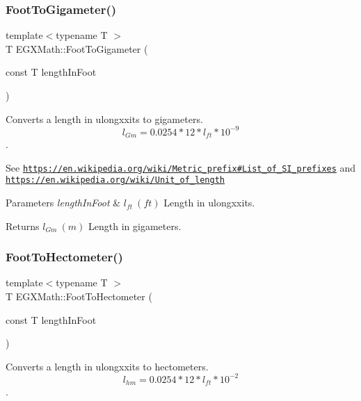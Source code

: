 \subsubsection{\texorpdfstring{Foot\+To\+Gigameter()}{FootToGigameter()}}
{\footnotesize\ttfamily template$<$typename T $>$ \\
T E\+G\+X\+Math\+::\+Foot\+To\+Gigameter (\begin{DoxyParamCaption}\item[{const T}]{length\+In\+Foot }\end{DoxyParamCaption})}



Converts a length in ulongxxits to gigameters. \[ l_{Gm}=0.0254 * 12 * l_{ft} * 10^{-9} \]. 

See \href{https://en.wikipedia.org/wiki/Metric_prefix#List_of_SI_prefixes}{\tt https\+://en.\+wikipedia.\+org/wiki/\+Metric\+\_\+prefix\#\+List\+\_\+of\+\_\+\+S\+I\+\_\+prefixes} and \href{https://en.wikipedia.org/wiki/Unit_of_length}{\tt https\+://en.\+wikipedia.\+org/wiki/\+Unit\+\_\+of\+\_\+length} 
\begin{DoxyParams}{Parameters}
{\em length\+In\+Foot} & $ l_{ft}\ (ft)$ Length in ulongxxits. \\
\hline
\end{DoxyParams}
\begin{DoxyReturn}{Returns}
$ l_{Gm}\ (m)$ Length in gigameters. 
\end{DoxyReturn}
\mbox{\label{group___e_g_x_math-_conversions-_length_conversions-_imperial-_foot-_s_i_ga355716f167803ca8218c845eb7df7792}} 
\subsubsection{\texorpdfstring{Foot\+To\+Hectometer()}{FootToHectometer()}}
{\footnotesize\ttfamily template$<$typename T $>$ \\
T E\+G\+X\+Math\+::\+Foot\+To\+Hectometer (\begin{DoxyParamCaption}\item[{const T}]{length\+In\+Foot }\end{DoxyParamCaption})}



Converts a length in ulongxxits to hectometers. \[ l_{hm}=0.0254 * 12 * l_{ft} * 10^{-2} \]. 

